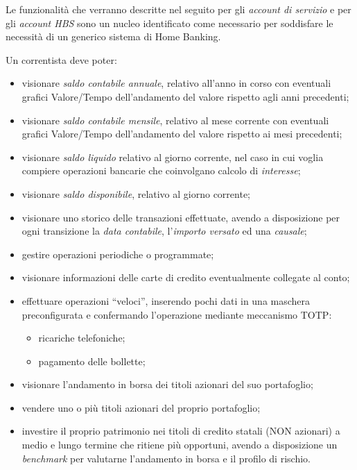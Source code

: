
Le funzionalità che verranno descritte nel seguito per gli \emph{account di servizio} e per gli \emph{account HBS} sono un nucleo identificato come necessario per soddisfare le necessit\`a di un generico sistema di Home Banking.

Un correntista deve poter:
\begin{itemize} 
	\item visionare \emph{saldo contabile annuale}, relativo all'anno in corso con eventuali grafici Valore/Tempo dell'andamento del valore rispetto agli anni precedenti;
	\item visionare \emph{saldo contabile mensile}, relativo al mese corrente con eventuali grafici Valore/Tempo dell'andamento del valore rispetto ai mesi precedenti;
	\item visionare \emph{saldo liquido} relativo al giorno corrente, nel caso in cui voglia compiere operazioni bancarie che coinvolgano calcolo di \emph{interesse};
	\item visionare \emph{saldo disponibile}, relativo al giorno corrente;
	\item visionare uno storico delle transazioni effettuate, avendo a disposizione per ogni transizione la \emph{data contabile}, l'\emph{importo versato} ed una \emph{causale};
	\item gestire operazioni periodiche o programmate;
	\item visionare informazioni delle carte di credito eventualmente collegate al conto;
	\item effettuare operazioni ``veloci'', inserendo pochi dati in una maschera preconfigurata e confermando l'operazione mediante meccanismo TOTP:
	\begin{itemize}
			\item ricariche telefoniche;
			\item pagamento delle bollette;
	\end{itemize}
	\item visionare l'andamento in borsa dei titoli azionari del suo portafoglio;
	\item vendere uno o più titoli azionari del proprio portafoglio;
	\item investire il proprio patrimonio nei titoli di credito statali (NON azionari) a medio e lungo termine che ritiene più opportuni, avendo a disposizione un \emph{benchmark} per valutarne l'andamento in borsa e il profilo di rischio.
\end{itemize}	

